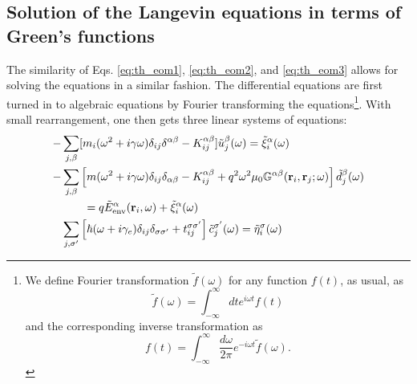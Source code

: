 
\subsection{Solution of the Langevin equations in terms of Green's functions}
\label{sec:th_eom_solution}
The similarity of Eqs. \eqref{eq:th_eom1}, \eqref{eq:th_eom2}, and \eqref{eq:th_eom3} allows for solving the equations in a similar fashion. The differential equations are first turned in to algebraic equations by Fourier transforming the equations\footnote{We define Fourier transformation $\tilde f(\omega)$ for any function $f(t)$, as usual, as
\begin{equation}
 \tilde f(\omega) = \int_{-\infty}^{\infty} dt e^{i\omega t} f(t) \label{eq:th_fourier}
\end{equation}
and the corresponding inverse transformation as
\begin{equation}
 f(t) = \int_{-\infty}^{\infty} \frac{d\omega}{2\pi} e^{-i\omega t}\tilde f(\omega). \label{eq:th_fourier_inv}
\end{equation}}.
With small rearrangement, one then gets three linear systems of equations:
\begin{subequations}
\begin{align}
   - & \sum_{j,\beta}  [m_i (\omega^2+i\gamma \omega) \delta_{ij}\delta^{\alpha\beta} - K_{ij}^{\alpha\beta}] \tilde{u}_j^{\beta}(\omega) = \tilde \xi_i^{\alpha}(\omega) \label{eq:th_eom_fourier_phonon} \\
  - &  \sum_{j,\beta} \left[m(\omega^2+i\gamma\omega) \delta_{ij}\delta_{\alpha\beta} - K_{ij}^{\alpha\beta} +q^2 \omega^2 \mu_0 \mathbb{G}^{\alpha\beta}(\mathbf{r}_i,\mathbf{r}_j;\omega) \right]\tilde{d}_j^{\beta}(\omega) \notag \\
  & \qquad = q\tilde{E}_{\textrm{env}}^{\alpha}(\mathbf{r}_i,\omega) + \tilde{\xi}^{\alpha}_i(\omega) \label{eq:th_eom_fourier_photon} \\ 
  &  \sum_{j,\sigma'} \left[\hbar (\omega+i\gamma_e) \delta_{ij}\delta_{\sigma\sigma'} + t_{ij}^{\sigma\sigma'} \right] \tilde c_j^{\sigma'}(\omega) = \tilde \eta_i^{\sigma}(\omega)   \label{eq:th_eom_fourier_electron}
\end{align}
\end{subequations}
